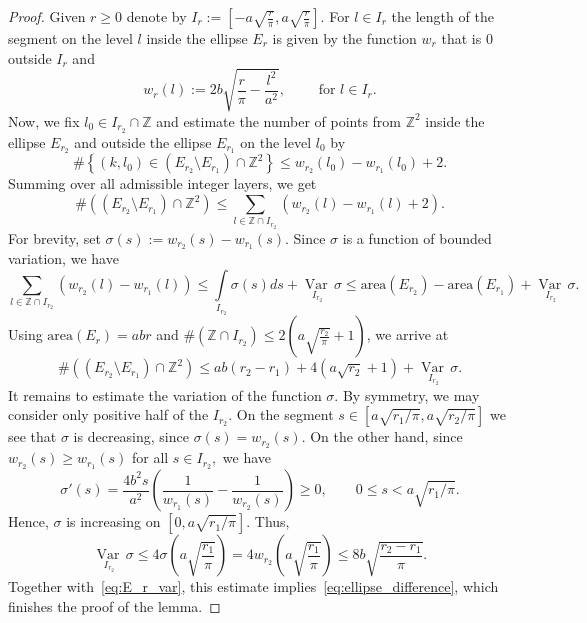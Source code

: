 \documentclass[11pt]{amsart}
\numberwithin{equation}{section}
\newcommand{\Z}{{\mathbb Z}}
\DeclareMathOperator*{\Var}{Var\,}
\begin{document}
\begin{proof}
Given $r\geq0$ denote by $I_r:=[-a\sqrt{\frac{r}{\pi}}, a\sqrt{\frac{r}{\pi}}]$.
    For  $l \in I_r$ the length of the segment on the level $l$ inside the ellipse $E_{r}$ is given by the function $w_r$ that is $0$ outside $I_r$ and
    \begin{equation}
        w_r(l):= 2b\sqrt{\frac{r}{\pi}-\frac{l^2}{a^2}}, \qquad \text{ for } l\in I_r.
    \end{equation}
Now, we fix $l_0 \in I_{r_2} \cap \Z$ and estimate the number of points from $\Z^2$ inside the ellipse $E_{r_2}$ and outside the ellipse $E_{r_1}$ on the level $l_0$ by
    \begin{equation}
        \#\left\{(k,l_0) \in  ( E_{r_2} \setminus E_{r_1}) \cap \Z^2 \right\} \leq w_{r_2}(l_0) - w_{r_1}(l_0) + 2. 
    \end{equation}
Summing over all admissible integer layers, we get
    \begin{equation}
        \#( (E_{r_2} \setminus E_{r_1}) \cap \Z^2 ) \leq \sum\limits_{l\in \Z \cap I_{r_2}} (w_{r_2}(l) - w_{r_1}(l) + 2). 
    \end{equation}
For brevity, set $\sigma(s):=w_{r_2}(s) - w_{r_1}(s).$
Since $\sigma$ is a function of bounded variation, we have
\begin{equation}
        \sum\limits_{l\in \Z \cap I_{r_2}} (w_{r_2}(l) - w_{r_1}(l)) \leq 
        \int\limits_{I_{r_2}} \sigma(s) ds + \Var\limits_{I_{r_2}} \sigma \leq \mathrm{area}(E_{r_2}) - \mathrm{area}(E_{r_1}) +  \Var\limits_{I_{r_2}} \sigma .
\end{equation}
Using $ \mathrm{area}(E_{r}) = ab r$ and $\#(\Z \cap I_{r_2}) \leq 2 \left(a\sqrt{\frac{r_2}{\pi}} + 1\right)$, we arrive at 
    \begin{equation}\label{eq:E_r_var}
        \#( (E_{r_2} \setminus E_{r_1}) \cap \Z^2 ) \leq ab(r_2-r_1) + 4(a\sqrt{r_2} +1) +  \Var\limits_{I_{r_2}} \sigma. 
    \end{equation}
It remains to estimate the variation of the function $\sigma.$ By symmetry, we may consider only positive half of the $I_{r_2}.$
On the segment $s \in [a\sqrt{r_1/\pi},a\sqrt{r_2/\pi}]$ we see that $\sigma$ is decreasing, since $\sigma(s) = w_{r_2}(s)$. On the other hand, since
$w_{r_2}(s) \geq w_{r_1}(s)$ for all $s \in I_{r_2},$ we have
$$
\sigma'(s) = \frac{4b^2s}{a^2}\left(\frac{1}{w_{r_1}(s)} - \frac{1}{w_{r_2}(s)} \right) \geq 0, \qquad  0\leq s< a\sqrt{r_1/\pi}.
$$
Hence, $\sigma$ is increasing on $[0,a\sqrt{r_1/\pi}].$
Thus,
\begin{equation}
    \Var\limits_{I_{r_2}} \sigma \leq  4\sigma \left(a\sqrt{\frac{r_1}{\pi}} \right) = 4w_{r_2}\left(a\sqrt{\frac{r_1}{\pi}} \right) \leq 8b\sqrt{\frac{r_2-r_1}{\pi}}.
\end{equation}
Together with~\eqref{eq:E_r_var}, this estimate implies~\eqref{eq:ellipse_difference}, which finishes the proof of the lemma.
\end{proof}
\end{document}
